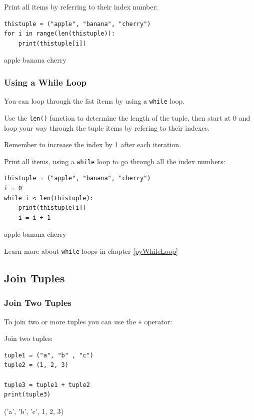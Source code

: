 \documentclass[12pt,a4paper]{article}
\newcommand{\code}[1]{%
	\colorbox{backcolour}{\lstinline{#1}}%
}
\newcommand{\lcode}[1]{%
	\lstinline{#1}%
}
\begin{document}
\begin{ebox}
Print all items by referring to their index number:
	\begin{lstlisting}
thistuple = ("apple", "banana", "cherry")
for i in range(len(thistuple)):
    print(thistuple[i])
	\end{lstlisting}
\tcblower
	\begin{vercode}
apple
banana
cherry
	\end{vercode}
\end{ebox}
\subsubsection{Using a While Loop}

You can loop through the list items by using a \code{while} loop.

Use the \code{len()} function to determine the length of the tuple, then start
at 0 and loop your way through the tuple items by refering to their indexes.

Remember to increase the index by 1 after each iteration.

\begin{ebox}
Print all items, using a \lcode{while} loop to go through all the index numbers:
	\begin{lstlisting}
thistuple = ("apple", "banana", "cherry")
i = 0
while i < len(thistuple):
    print(thistuple[i])
    i = i + 1
	\end{lstlisting}
\tcblower
	\begin{vercode}
apple
banana
cherry
	\end{vercode}
\end{ebox}

Learn more about \code{while} loops in chapter \ref{pyWhileLoop}
\subsection{Join Tuples}

\subsubsection{Join Two Tuples}

To join two or more tuples you can use the \code{+} operator:

\begin{ebox}
Join two tuples:
	\begin{lstlisting}
tuple1 = ("a", "b" , "c")
tuple2 = (1, 2, 3)

tuple3 = tuple1 + tuple2
print(tuple3)
	\end{lstlisting}
\tcblower
	\begin{vercode}
('a', 'b', 'c', 1, 2, 3)
	\end{vercode}
\end{ebox}
\end{document}

